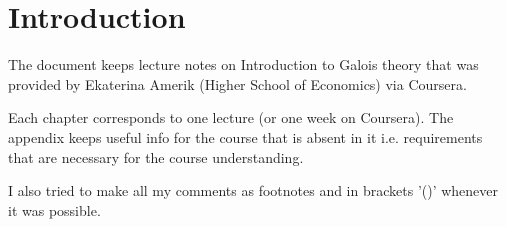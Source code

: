 \chapter*{Introduction}

The document keeps lecture notes on Introduction to Galois theory that
was provided by Ekaterina Amerik (Higher School of Economics) via
Coursera.

Each chapter corresponds to one lecture (or one week on Coursera). The
appendix keeps useful info for the course that is absent in it
i.e. requirements that are necessary for the course understanding.

I also tried to make all my comments as footnotes and in brackets '()'
whenever it was possible. 
